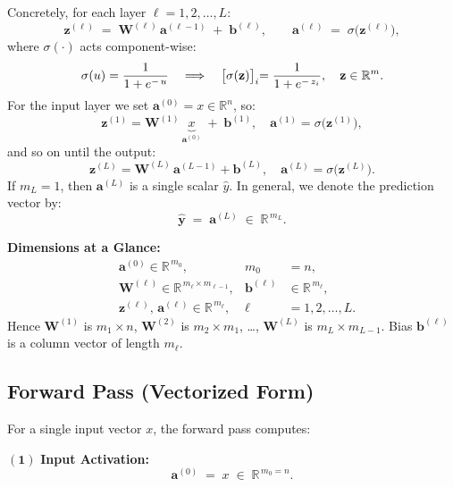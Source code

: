 \documentclass{article}
\begin{document}
\noindent Concretely, for each layer \(\ell = 1,2,\dots,L\):
\[
    \mathbf{z}^{(\ell)}
    \;=\; \mathbf{W}^{(\ell)}\,\mathbf{a}^{(\ell-1)} \;+\; \mathbf{b}^{(\ell)},
    \qquad
    \mathbf{a}^{(\ell)}
    \;=\; \sigma\bigl(\mathbf{z}^{(\ell)}\bigr),
\]
where \(\sigma(\cdot)\) acts component-wise:
\[
    \sigma(u) 
    = \frac{1}{1 + e^{-\,u}}
    \quad
    \Longrightarrow
    \quad
    \bigl{[\sigma(\mathbf{z})\bigr]}_{i}
    = \frac{1}{1 + e^{-\,z_{i}}}, 
    \quad
    \mathbf{z}\in\mathbb{R}^{m}.
\]
For the input layer we set \(\mathbf{a}^{(0)} = x \in \mathbb{R}^n\), so:
\[
    \mathbf{z}^{(1)} 
    = \mathbf{W}^{(1)}\,\underbrace{x}_{\mathbf{a}^{(0)}} \;+\; \mathbf{b}^{(1)},
    \quad
    \mathbf{a}^{(1)} = \sigma\bigl(\mathbf{z}^{(1)}\bigr),
\]
and so on until the output:
\[
    \mathbf{z}^{(L)} = \mathbf{W}^{(L)}\,\mathbf{a}^{(L-1)} + \mathbf{b}^{(L)},
    \quad
    \mathbf{a}^{(L)} = \sigma\bigl(\mathbf{z}^{(L)}\bigr).
\]
If \(m_{L}=1\), then \(\mathbf{a}^{(L)}\) is a single scalar \(\hat{y}\). In general, we denote the prediction vector by:
\[
    \hat{\mathbf{y}} \;=\; \mathbf{a}^{(L)} \;\in\;\mathbb{R}^{\,m_{L}}.
\]

\vspace{0.5em}
\noindent \textbf{Dimensions at a Glance:}
\[
\begin{aligned}
    &\mathbf{a}^{(0)} \in \mathbb{R}^{\,m_{0}}, 
    & m_{0} &= n, 
    \\
    &\mathbf{W}^{(\ell)} \in \mathbb{R}^{\,m_{\ell}\times m_{\ell-1}}, 
    & \mathbf{b}^{(\ell)} &\in \mathbb{R}^{\,m_{\ell}}, 
    \\
    &\mathbf{z}^{(\ell)},\,\mathbf{a}^{(\ell)} \in \mathbb{R}^{\,m_{\ell}}, 
    & \ell&=1,2,\dots,L.
\end{aligned}
\]
Hence \(\mathbf{W}^{(1)}\) is \(m_{1}\times n\), \(\mathbf{W}^{(2)}\) is \(m_{2}\times m_{1}\), \dots, \(\mathbf{W}^{(L)}\) is \(m_{L}\times m_{L-1}\). Bias \(\mathbf{b}^{(\ell)}\) is a column vector of length \(m_{\ell}\).

\subsection{Forward Pass (Vectorized Form)}\label{sec:n-inputs-layers-forward}

\noindent For a single input vector \(x\), the forward pass computes:

\medskip
\noindent\(\mathbf{(1)}\) \textbf{Input Activation:}
\[
    \mathbf{a}^{(0)} \;=\; x \;\in\;\mathbb{R}^{\,m_{0} = n}.
\]
\end{document}
